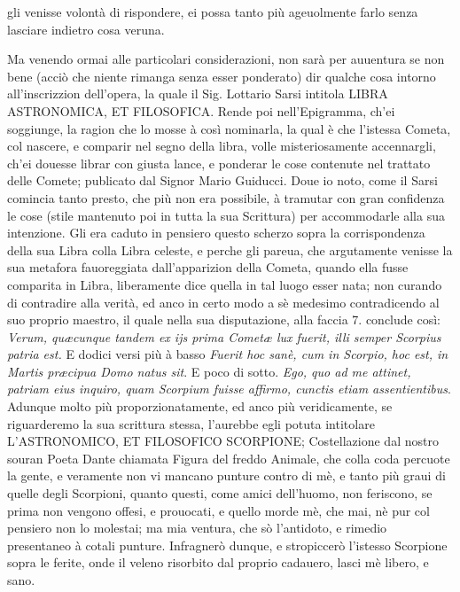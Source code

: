 \documentclass[11pt,twoside,openany]{book}
\begin{document}
gli venisse volontà di rispondere, ei possa tanto più ageuolmente farlo senza lasciare indietro cosa veruna.


Ma venendo ormai alle particolari considerazioni, non sarà per auuentura se non bene (acciò che niente rimanga senza esser ponderato) dir qualche cosa intorno all'inscrizzion dell'opera, la quale il Sig. Lottario Sarsi intitola LIBRA ASTRONOMICA, ET FILOSOFICA. Rende poi nell'Epigramma, ch'ei soggiunge, la ragion che lo mosse à così nominarla, la qual è che l'istessa Cometa, col nascere, e comparir nel segno della libra, volle misteriosamente accennargli, ch'ei douesse librar con giusta lance, e ponderar le cose contenute nel trattato delle Comete; publicato dal Signor Mario Guiducci. Doue io noto, come il Sarsi comincia tanto presto, che più non era possibile, à tramutar con gran confidenza le cose (stile mantenuto poi in tutta la sua Scrittura) per accommodarle alla sua intenzione. Gli era caduto in pensiero questo scherzo sopra la corrispondenza della sua Libra colla Libra celeste, e perche gli pareua, che argutamente venisse la sua metafora fauoreggiata dall'apparizion della Cometa, quando ella fusse comparita in Libra, liberamente dice quella in tal luogo esser nata; non curando di contradire alla verità, ed anco in certo modo a sè medesimo contradicendo al suo proprio maestro, il quale nella sua disputazione, alla faccia 7. conclude così: \textit{Verum, quæcunque tandem ex ijs prima Cometæ lux fuerit, illi semper Scorpius patria est.} E dodici versi più à basso \textit{Fuerit hoc sanè, cum in Scorpio, hoc est, in Martis præcipua Domo natus sit}. E poco di sotto. \textit{E}\textit{go, quo ad me attinet, patriam eius inquiro, quam Scorpium fuisse affirmo, cunctis etiam assentientibus}. Adunque molto più proporzionatamente, ed anco più veridicamente, se riguarderemo la sua scrittura stessa, l'aurebbe egli potuta intitolare L'ASTRONOMICO, ET FILOSOFICO SCORPIONE; Costellazione dal nostro souran Poeta Dante chiamata Figura del freddo Animale, che colla coda percuote la gente, e veramente non vi mancano punture contro di mè, e tanto più graui di quelle degli Scorpioni, quanto questi, come amici dell'huomo, non feriscono, se prima non vengono offesi, e prouocati, e quello morde mè, che mai, nè pur col pensiero non lo molestai; ma mia ventura, che sò l'antidoto, e rimedio presentaneo à cotali punture. Infragnerò dunque, e stropiccerò l'istesso Scorpione sopra le ferite, onde il veleno risorbito dal proprio cadauero, lasci mè libero, e sano.
\end{document}

